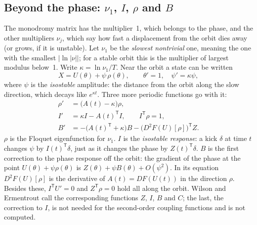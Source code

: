 \documentclass[11pt,a4paper]{article}
\begin{document}
\subsection*{Beyond the phase: $\nu_1$, $I$, $\rho$ and $B$}\label{sec:isostable}

The monodromy matrix has the multiplier~1, which belongs to the phase, and the other multipliers $\nu_j$, which say how fast a displacement from the orbit dies away (or grows, if it is unstable). Let $\nu_1$ be the \emph{slowest nontrivial} one, meaning the one with the smallest $|\ln|\nu||$; for a stable orbit this is the multiplier of largest modulus below~1. Write $\kappa=\ln\nu_1/T$. Near the orbit a state can be written
\begin{equation}
  X=U(\theta)+\psi\,\rho(\theta),\qquad \theta'=1,\quad \psi'=\kappa\psi,
\end{equation}
where $\psi$ is the \emph{isostable} amplitude: the distance from the orbit along the slow direction, which decays like $e^{\kappa t}$. Three more periodic functions go with it:
\begin{align}
  \rho'&=\bigl(A(t)-\kappa\bigr)\rho, \\
  I'&=\kappa I-A(t)^{\mathsf T}I,\qquad I^{\mathsf T}\rho=1, \\
  B'&=-\bigl(A(t)^{\mathsf T}+\kappa\bigr)B-\bigl(D^2F(U)[\rho]\bigr)^{\mathsf T}Z .
\end{align}
$\rho$ is the Floquet eigenfunction for $\nu_1$. $I$ is the \emph{isostable response}: a kick $\delta$ at time $t$ changes $\psi$ by $I(t)^{\mathsf T}\delta$, just as it changes the phase by $Z(t)^{\mathsf T}\delta$. $B$ is the first correction to the phase response off the orbit: the gradient of the phase at the point $U(\theta)+\psi\rho(\theta)$ is $Z(\theta)+\psi B(\theta)+O(\psi^2)$. In its equation $D^2F(U)[\rho]$ is the derivative of $A(t)=DF(U(t))$ in the direction $\rho$. Besides these, $I^{\mathsf T}U'=0$ and $Z^{\mathsf T}\rho=0$ hold all along the orbit. Wilson and Ermentrout \cite{wilson2019} call the corresponding functions $Z$, $I$, $B$ and $C$; the last, the correction to $I$, is not needed for the second-order coupling functions and is not computed.
\end{document}

